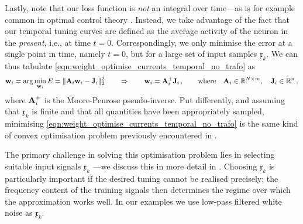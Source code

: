 Lastly, note that our loss function is \emph{not} an integral over time---as is for example common in optimal control theory \citep[e.g.,][Chapter~14]{brogan1991modern}.
Instead, we take advantage of the fact that our temporal tuning curves are defined as the average activity of the neuron in the \emph{present}, i.e., at time $t = 0$.
Correspondingly, we only minimise the error at a single point in time, namely $t = 0$, but for a large set of input samples $\mathfrak{x}_k$.
We can thus tabulate \cref{eqn:weight_optimise_currents_temporal_no_trafo} as
\begin{align*}
	\mathbf{w}_i = \arg\min_{\mathbf{w}_i} E = \| \mathbf{A}_i \mathbf{w}_i - \mathbf{J}_i \|_2^2 \quad\quad \Rightarrow \quad\quad \mathbf{w}_i = \mathbf{A}_i^+ \mathbf{J}_i \,, \quad\quad \text{where} \quad \mathbf{A}_i \in \mathbb{R}^{N \times m}, \quad \mathbf{J}_i \in \mathbb{R}^n \,,
\end{align*}
where $\mathbf{A}_i^+$ is the Moore-Penrose pseudo-inverse.
Put differently, and assuming that $\mathfrak{x}_k$ is finite and that all quantities have been appropriately sampled, minimising \cref{eqn:weight_optimise_currents_temporal_no_trafo} is the same kind of convex optimisation problem previously encountered in .

The primary challenge in solving this optimisation problem lies in selecting suitable input signals $\mathfrak{x}_k$ \citep[cf.][Section~10.2.5]{verhaegen2007filtering}---we discuss this in more detail in .
Choosing $\mathfrak{x}_k$ is particularly important if the desired tuning cannot be realised precisely; the frequency content of the training signals then determines the regime over which the approximation works well.
In our examples we use low-pass filtered white noise as $\mathfrak{x}_k$.

